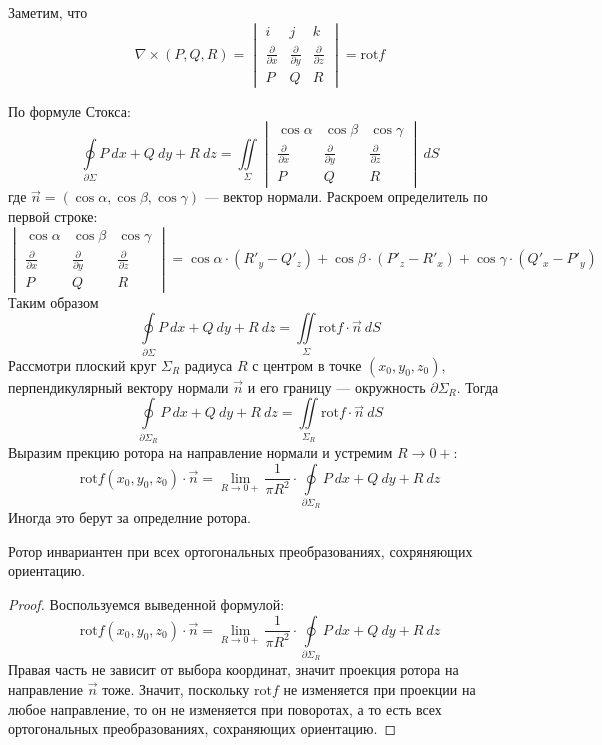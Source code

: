 \begin{comm}
    Заметим, что 
    \[\nabla\times(P,Q,R)=\begin{vmatrix}
        i & j & k\\
        \frac{\partial}{\partial x} & \frac{\partial}{\partial y} & \frac{\partial}{\partial z}\\
        P & Q & R
    \end{vmatrix}=\text{rot}f\]
\end{comm}
\begin{comm}
    По формуле Стокса:
    \[\oint\limits_{\partial \Sigma}P\ dx+Q\ dy+R\ dz=\iint\limits_{\Sigma}\begin{vmatrix}
        \cos{\alpha} & \cos{\beta} & \cos{\gamma}\\
        \frac{\partial}{\partial x} & \frac{\partial}{\partial y} & \frac{\partial}{\partial z}\\
        P & Q & R
    \end{vmatrix}\ dS\]
    где $\vec{n}=(\cos{\alpha}, \cos{\beta}, \cos{\gamma})$ --- вектор нормали. Раскроем определитель по первой строке:
    \[\begin{vmatrix}
        \cos{\alpha} & \cos{\beta} & \cos{\gamma}\\
        \frac{\partial}{\partial x} & \frac{\partial}{\partial y} & \frac{\partial}{\partial z}\\
        P & Q & R
    \end{vmatrix}=\cos{\alpha}\cdot (R'_y-Q'_z)+\cos{\beta}\cdot (P'_z-R'_x)+\cos{\gamma}\cdot (Q'_x-P'_y)\]
    Таким образом
    \[\oint\limits_{\partial \Sigma}P\ dx+Q\ dy+R\ dz=\iint\limits_{\Sigma}\text{rot}f\cdot \vec{n}\ dS\]
    Рассмотри плоский круг $\Sigma_R$ радиуса $R$ с центром в точке $(x_0,y_0,z_0)$, перпендикулярный вектору нормали $\vec{n}$ и его границу --- окружность $\partial \Sigma_R$. Тогда
    \[\oint\limits_{\partial\Sigma_R}P\ dx+Q\ dy+R\ dz=\iint\limits_{\Sigma_R}\text{rot}f\cdot \vec{n}\ dS\]
    Выразим прекцию ротора на направление нормали и устремим $R\to 0+$:
    \[\text{rot}f(x_0,y_0,z_0)\cdot \vec{n}=\lim\limits_{R\to 0+}\frac{1}{\pi R^2}\cdot \oint\limits_{\partial\Sigma_R}P\ dx+ Q\ dy+ R\ dz\]
    Иногда это берут за определние ротора.
\end{comm}
\begin{statement}
    Ротор инвариантен при всех ортогональных преобразованиях, сохряняющих ориентацию.
\end{statement}
\begin{proof}
    Воспользуемся выведенной формулой:
    \[\text{rot}f(x_0,y_0,z_0)\cdot \vec{n}=\lim\limits_{R\to 0+}\frac{1}{\pi R^2}\cdot \oint\limits_{\partial\Sigma_R}P\ dx+ Q\ dy+ R\ dz\]
    Правая часть не зависит от выбора координат, значит проекция ротора на направление $\vec{n}$ тоже. Значит, поскольку $\text{rot}f$ не изменяется при проекции на любое направление, то он не изменяется при поворотах, а то есть всех ортогональных преобразованиях, сохраняющих ориентацию. 
\end{proof}
